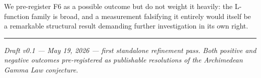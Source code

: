 \documentclass[
  letterpaper,
  11pt]{article}
\theoremstyle{plain}
\theoremstyle{definition}
\theoremstyle{remark}
\begin{document}
We pre-register F6 as a possible outcome but do not weight it heavily: the L-function family is broad, and a measurement falsifying it entirely would itself be a remarkable structural result demanding further investigation in its own right.

\begin{center}\rule{0.5\linewidth}{0.5pt}\end{center}

\emph{Draft v0.1 --- May 19, 2026 --- first standalone refinement pass. Both positive and negative outcomes pre-registered as publishable resolutions of the Archimedean Gamma Law conjecture.}
\end{document}

